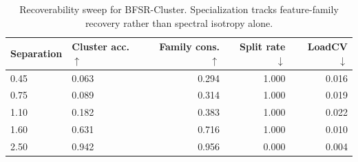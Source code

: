\begin{table}[!htbp]
\centering
\caption{Recoverability sweep for BFSR-Cluster. Specialization tracks feature-family recovery rather than spectral isotropy alone.}
\label{tab:e3_recoverability}
\begin{tabular}{llrrr}
\toprule
Separation & Cluster acc. $\uparrow$ & Family cons. $\uparrow$ & Split rate $\downarrow$ & LoadCV $\downarrow$ \\
\midrule
0.45 & 0.063 & 0.294 & 1.000 & 0.016 \\
0.75 & 0.089 & 0.314 & 1.000 & 0.019 \\
1.10 & 0.182 & 0.383 & 1.000 & 0.022 \\
1.60 & 0.631 & 0.716 & 1.000 & 0.010 \\
2.50 & 0.942 & 0.956 & 0.000 & 0.004 \\
\bottomrule
\end{tabular}
\end{table}
